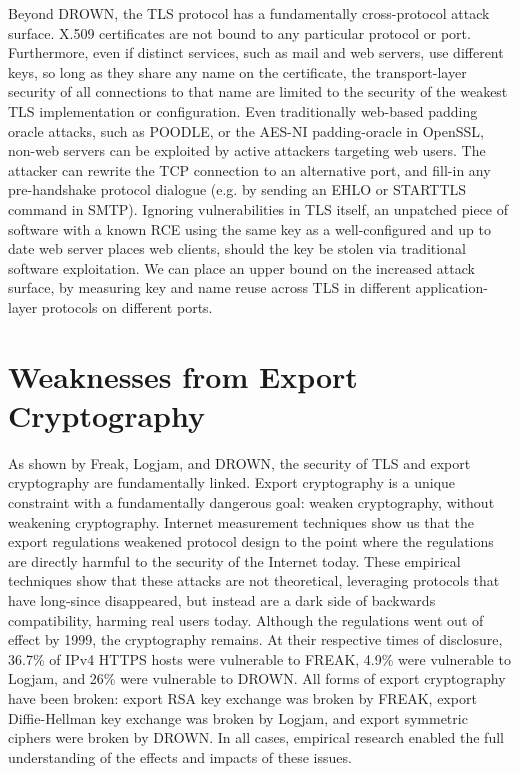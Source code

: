 Beyond DROWN, the TLS protocol has a fundamentally cross-protocol attack
surface. X.509 certificates are not bound to any particular protocol or port.
Furthermore, even if distinct services, such as mail and web servers, use
different keys, so long as they share any name on the certificate, the
transport-layer security of all connections to that name are limited to the
security of the weakest TLS implementation or configuration. Even traditionally
web-based padding oracle attacks, such as POODLE, or the AES-NI padding-oracle
in OpenSSL, non-web servers can be exploited by active attackers targeting web
users. The attacker can rewrite the TCP connection to an alternative port, and
fill-in any pre-handshake protocol dialogue (e.g. by sending an EHLO or
STARTTLS command in SMTP). Ignoring vulnerabilities in TLS itself, an unpatched
piece of software with a known RCE using the same key as a well-configured and
up to date web server places web clients, should the key be stolen via
traditional software exploitation. We can place an upper bound on the increased
attack surface, by measuring key and name reuse across TLS in different
application-layer protocols on different ports.

\section{Weaknesses from Export Cryptography}


As shown by Freak, Logjam, and DROWN, the security of TLS and export
cryptography are fundamentally linked. Export cryptography is a unique
constraint with a fundamentally dangerous goal: weaken cryptography, without
weakening cryptography. Internet measurement techniques show us that the export
regulations weakened protocol design to the point where the regulations are
directly harmful to the security of the Internet today. These empirical
techniques show that these attacks are not theoretical, leveraging protocols
that have long-since disappeared, but instead are a dark side of backwards
compatibility, harming real users today. Although the regulations went out of
effect by 1999, the cryptography remains. At their respective times of
disclosure, 36.7\% of IPv4 HTTPS hosts were vulnerable to FREAK, 4.9\% were
vulnerable to Logjam, and 26\% were vulnerable to DROWN. All forms of export
cryptography have been broken: export RSA key exchange was broken by FREAK,
export Diffie-Hellman key exchange was broken by Logjam, and export symmetric
ciphers were broken by DROWN. In all cases, empirical research enabled the full
understanding of the effects and impacts of these issues.

